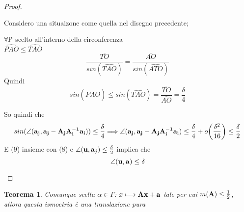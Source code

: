 \documentclass[10pt,a4paper]{article}
\newtheorem{theorem}{Teorema}[section]
\begin{document}
\begin{proof}
\begin{itemize}
\begin{itemize}
Considero una situaizone come quella nel disegno precedente; \\ 
\begin{minipage}{0.6\textwidth}
\end{minipage} \hfill
\begin{minipage}{0.4\textwidth}
$\forall \rm P$ scelto all'interno della circonferenza \\ $ \widehat{PAO} \leq \widehat{TAO} $ 
\[ \frac{\overline{TO}}{sin( \widehat{TAO}) } = \frac{\overline{AO}}{sin( \widehat{ATO}) } \] 
Quindi
\[ sin(\widehat{PAO}) \leq sin( \widehat{TAO})= \frac{\overline{TO}}{\overline{AO}} = \frac{\delta}{4}\]
\end{minipage}

So quindi che 
\begin{equation}
sin(\angle(\vb{a_j}, \vb{a_j- A_j A_i^{-1} a_i} ) ) \leq \frac{\delta}{4} \Longrightarrow \angle(\vb{a_j}, \vb{a_j- A_j A_i^{-1} a_i} ) \leq \frac{\delta}{4} + o \bigg( \frac{\delta^2}{16} \bigg) \leq \frac{\delta}{2}
\end{equation}
E (9) insieme con (8) e $ \angle(\vb{u}, \vb{a}_j) \leq \frac{\delta}{2}$ implica che 
\[ \angle (\vb{u, a}) \leq \delta \]

\end{itemize}

\end{itemize}

\end{proof}


\begin{theorem}
 Comunque scelta $\alpha \in \Gamma$:  $x \longmapsto \vb{Ax +a} $  tale per cui $m(\vb{A}) \leq \frac{1}{2} $, allora questa ismoetria è una translazione pura 
\end{theorem}
\end{document}
